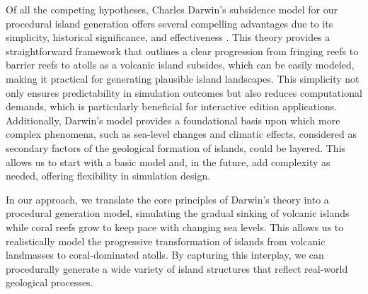 

Of all the competing hypotheses, Charles Darwin's subsidence model for our procedural island generation offers several compelling advantages due to its simplicity, historical significance, and effectiveness \cite{Tomascik1997}. This theory provides a straightforward framework that outlines a clear progression from fringing reefs to barrier reefs to atolls as a volcanic island subsides, which can be easily modeled, making it practical for generating plausible island landscapes. This simplicity not only ensures predictability in simulation outcomes but also reduces computational demands, which is particularly beneficial for interactive edition applications. Additionally, Darwin's model provides a foundational basis upon which more complex phenomena, such as sea-level changes and climatic effects, considered as secondary factors of the geological formation of islands, could be layered. This allows us to start with a basic model and, in the future, add complexity as needed, offering flexibility in simulation design. 

In our approach, we translate the core principles of Darwin's theory into a procedural generation model, simulating the gradual sinking of volcanic islands while coral reefs grow to keep pace with changing sea levels. This allows us to realistically model the progressive transformation of islands from volcanic landmasses to coral-dominated atolls. By capturing this interplay, we can procedurally generate a wide variety of island structures that reflect real-world geological processes.



